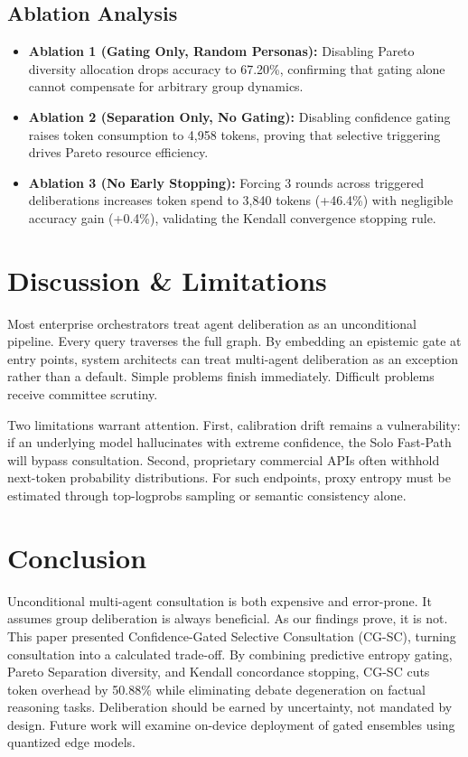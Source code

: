 \documentclass[conference]{IEEEtran}
\begin{document}
\subsection{Ablation Analysis}
\begin{itemize}
    \item \textbf{Ablation 1 (Gating Only, Random Personas):} Disabling Pareto diversity allocation drops accuracy to 67.20\%, confirming that gating alone cannot compensate for arbitrary group dynamics.
    \item \textbf{Ablation 2 (Separation Only, No Gating):} Disabling confidence gating raises token consumption to 4,958 tokens, proving that selective triggering drives Pareto resource efficiency.
    \item \textbf{Ablation 3 (No Early Stopping):} Forcing 3 rounds across triggered deliberations increases token spend to 3,840 tokens (+46.4\%) with negligible accuracy gain (+0.4\%), validating the Kendall convergence stopping rule.
\end{itemize}

\section{Discussion \& Limitations}
Most enterprise orchestrators treat agent deliberation as an unconditional pipeline. Every query traverses the full graph. By embedding an epistemic gate at entry points, system architects can treat multi-agent deliberation as an exception rather than a default. Simple problems finish immediately. Difficult problems receive committee scrutiny.

Two limitations warrant attention. First, calibration drift remains a vulnerability: if an underlying model hallucinates with extreme confidence, the Solo Fast-Path will bypass consultation. Second, proprietary commercial APIs often withhold next-token probability distributions. For such endpoints, proxy entropy must be estimated through top-logprobs sampling or semantic consistency alone.

\section{Conclusion}
Unconditional multi-agent consultation is both expensive and error-prone. It assumes group deliberation is always beneficial. As our findings prove, it is not. This paper presented Confidence-Gated Selective Consultation (CG-SC), turning consultation into a calculated trade-off. By combining predictive entropy gating, Pareto Separation diversity, and Kendall concordance stopping, CG-SC cuts token overhead by 50.88\% while eliminating debate degeneration on factual reasoning tasks. Deliberation should be earned by uncertainty, not mandated by design. Future work will examine on-device deployment of gated ensembles using quantized edge models.
\end{document}

